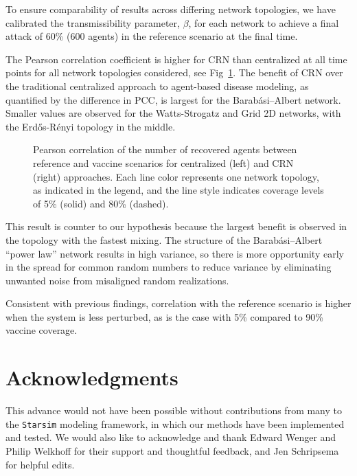 \documentclass[10pt,letterpaper]{article}
\newcommand{\starsim}{\texttt{Starsim} }
\newcommand{\er}{Erd{\H o}s-R{\'e}nyi }
\newcommand{\ba}{Barab\'asi--Albert }
\begin{document}
To ensure comparability of results across differing network topologies, we have calibrated the transmissibility parameter, $\beta$, for each network to achieve a final attack of 60\% (600 agents) in the reference scenario at the final time.

The Pearson correlation coefficient is higher for CRN than centralized at all time points for all network topologies considered, see Fig~\ref{f:sir_net_cor}. The benefit of CRN over the traditional centralized approach to agent-based disease modeling, as quantified by the difference in PCC, is largest for the \ba network. Smaller values are observed for the Watts-Strogatz and Grid 2D networks, with the \er topology in the middle.

\begin{figure}[h]%
\centering
\caption{Pearson correlation of the number of recovered agents between reference and vaccine scenarios for centralized (left) and CRN (right) approaches. Each line color represents one network topology, as indicated in the legend, and the line style indicates coverage levels of 5\% (solid) and 80\% (dashed).}
\label{f:sir_net_cor}
\end{figure}

This result is counter to our hypothesis because the largest benefit is observed in the topology with the fastest mixing. The structure of the \ba ``power law'' network results in high variance, so there is more opportunity early in the spread for common random numbers to reduce variance by eliminating unwanted noise from misaligned random realizations.

Consistent with previous findings, correlation with the reference scenario is higher when the system is less perturbed, as is the case with 5\% compared to 90\% vaccine coverage.


\section*{Acknowledgments}
This advance would not have been possible without contributions from many to the \starsim modeling framework, in which our methods have been implemented and tested. We would also like to acknowledge and thank Edward Wenger and Philip Welkhoff for their support and thoughtful feedback, and Jen Schripsema for helpful edits.

\nolinenumbers

%
%
% 
\end{document}
